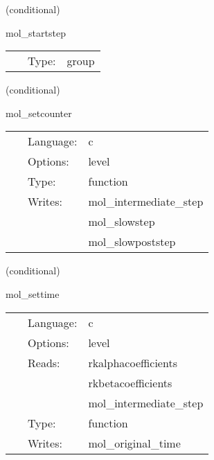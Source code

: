 \vspace{5mm}

   (conditional) 

\hspace{5mm} mol\_startstep 

\hspace{5mm}{\it mol internal setup for the evolution step } 


\hspace{5mm}

 \begin{tabular*}{160mm}{cll} 
~ & Type:  & group \\ 
\end{tabular*} 


\vspace{5mm}

   (conditional) 

\hspace{5mm} mol\_setcounter 

\hspace{5mm}{\it set the counter for the ode method to loop over } 


\hspace{5mm}

 \begin{tabular*}{160mm}{cll} 
~ & Language:  & c \\ 
~ & Options:  & level \\ 
~ & Type:  & function \\ 
~ & Writes:  & mol\_intermediate\_step \\ 
~& ~ &mol\_slowstep\\ 
~& ~ &mol\_slowpoststep\\ 
\end{tabular*} 


\vspace{5mm}

   (conditional) 

\hspace{5mm} mol\_settime 

\hspace{5mm}{\it ensure the correct time and timestep are used } 


\hspace{5mm}

 \begin{tabular*}{160mm}{cll} 
~ & Language:  & c \\ 
~ & Options:  & level \\ 
~ & Reads:  & rkalphacoefficients \\ 
~& ~ &rkbetacoefficients\\ 
~& ~ &mol\_intermediate\_step\\ 
~ & Type:  & function \\ 
~ & Writes:  & mol\_original\_time \\ 
\end{tabular*} 


